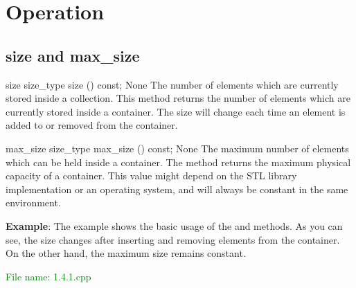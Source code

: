 
\section{Operation} %

\subsection{size and max\_size} %
\begin{methodinfo}
  {size}
  {size_type size () const;}
  {None}
  {The number of elements which are currently stored inside a collection.}
  {This method returns the number of elements which are currently stored inside a container. 
  The size will change each time an element is added to or removed from the container.}
\end{methodinfo}

\begin{methodinfo}
  {max_size}
  {size_type max_size () const;}
  {None}
  {The maximum number of elements which can be held inside a container.}
  {The method returns the maximum physical capacity of a container. This value might depend on 
  the STL library implementation or an operating system, and will always be constant in the same environment.}
\end{methodinfo}

\textbf{Example}: The example shows the basic usage of the  and 
 methods. As you can see, the size changes after inserting and removing 
elements from the container. On the other hand, the maximum size remains constant.

\textcolor{green}{File name: 1.4.1.cpp}

